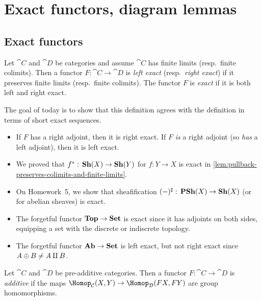 \chapter{Exact functors, diagram lemmas}

\section{Exact functors}
\noindent
\begin{defn}
Let \(\cat C\) and \(\cat D\) be categories and assume \(\cat C\) has finite limits (resp.~finite colimits).
Then a functor \(F\colon\cat C\to\cat D\) is \emph{left exact} (resp.~\emph{right exact}) if it preserves finite limits (resp.~finite colimits).
The functor \(F\) is \emph{exact} if it is both left and right exact.
\end{defn}

The goal of today is to show that this definition agrees with the definition in terms of short exact sequences.

\begin{exmp}
\begin{itemize}
\item 
  If \(F\) has a right adjoint, then it is right exact.
  If \(F\) \emph{is} a right adjoint (so \emph{has} a left adjoint), then it is left exact.
\item
  We proved that \(f^*\colon\catSheaf(X)\to\catSheaf(Y)\) for \(f\colon Y\to X\) is exact in \cref{lem:pullback-preserves-colimits-and-finite-limits}.
\item
  On Homework~5, we show that sheafification \((-)^\sharp\colon\catPresheaf(X)\to\catSheaf(X)\) (or for abelian sheaves) is exact.
\item
  The forgetful functor \(\mathbf{Top}\to\mathbf{Set}\) is exact since it has adjoints on both sides, equipping a set with the discrete or indiscrete topology.
\item
  The forgetful functor \(\mathbf{Ab}\to\mathbf{Set}\) is left exact, but not right exact since \(A\oplus B\neq A\amalg B\).
\end{itemize}
\end{exmp}

\begin{defn}
Let \(\cat C\) and \(\cat D\) be pre-additive categories.
Then a functor \(F\colon\cat C\to\cat D\) is \emph{additive} if the maps \(\Hom[\cat C](X,Y)\to\Hom[\cat D](FX,FY)\) are group homomorphisms.
\end{defn}

